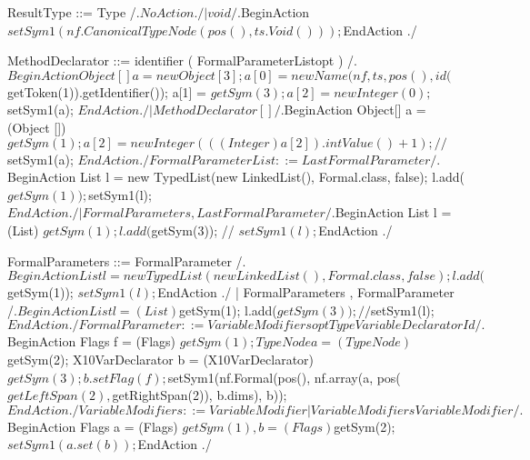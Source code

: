     ResultType ::= Type
        /.$NoAction./
                 | void
        /.$BeginAction
                    $setSym1(nf.CanonicalTypeNode(pos(), ts.Void()));
          $EndAction
        ./
    
    MethodDeclarator ::= identifier ( FormalParameterListopt )
        /.$BeginAction
                    Object[] a = new Object[3];
                    a[0] =  new Name(nf, ts, pos(), id($getToken(1)).getIdentifier());
                    a[1] = $getSym(3);
                    a[2] = new Integer(0);
                    $setSym1(a);
          $EndAction
        ./
                       | MethodDeclarator [ ]
        /.$BeginAction
                    Object[] a = (Object []) $getSym(1);
                    a[2] = new Integer(((Integer) a[2]).intValue() + 1);
                    // $setSym1(a);
          $EndAction
        ./
    
    FormalParameterList ::= LastFormalParameter
        /.$BeginAction
                    List l = new TypedList(new LinkedList(), Formal.class, false);
                    l.add($getSym(1));
                    $setSym1(l);
          $EndAction
        ./
                          | FormalParameters , LastFormalParameter
        /.$BeginAction
                    List l = (List) $getSym(1);
                    l.add($getSym(3));
                    // $setSym1(l);
          $EndAction
        ./
    
    FormalParameters ::= FormalParameter
        /.$BeginAction
                    List l = new TypedList(new LinkedList(), Formal.class, false);
                    l.add($getSym(1));
                    $setSym1(l);
          $EndAction
        ./
                       | FormalParameters , FormalParameter
        /.$BeginAction
                    List l = (List) $getSym(1);
                    l.add($getSym(3));
                    // $setSym1(l);
          $EndAction
        ./
    
    FormalParameter ::= VariableModifiersopt Type VariableDeclaratorId
        /.$BeginAction
                    Flags f = (Flags) $getSym(1);
                    TypeNode a = (TypeNode) $getSym(2);
                    X10VarDeclarator b = (X10VarDeclarator) $getSym(3);
                    b.setFlag(f);
                    $setSym1(nf.Formal(pos(), nf.array(a, pos($getLeftSpan(2), $getRightSpan(2)), b.dims), b));
          $EndAction
        ./
    
    VariableModifiers ::= VariableModifier
                        | VariableModifiers VariableModifier
        /.$BeginAction
                    Flags a = (Flags) $getSym(1),
                          b = (Flags) $getSym(2);
                    $setSym1(a.set(b));
          $EndAction
        ./
    
